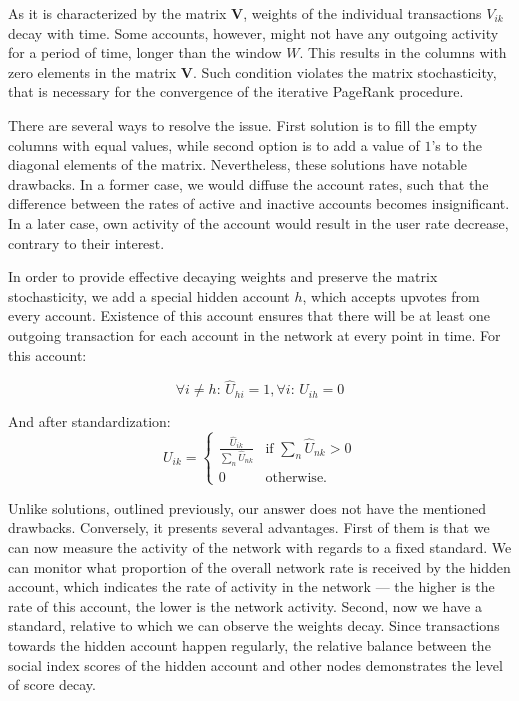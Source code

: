 \documentclass[a4paper,12pt]{article}
\begin{document}
	As it is characterized by the matrix $\boldsymbol{V}$, weights of the individual transactions $V_{ik}$ decay with time. Some accounts, however, might not have any outgoing activity for a period of time, longer than the window $W$. This results in the columns with zero elements in the matrix $\boldsymbol{V}$. Such condition violates the matrix stochasticity, that is necessary for the convergence of the iterative PageRank procedure. 
	
	There are several ways to resolve the issue. First solution is to fill the empty columns with equal values, while second option is to add a value of $1$'s to the diagonal elements of the matrix. Nevertheless, these solutions have notable drawbacks. In a former case, we would diffuse the account rates, such that the difference between the rates of active and inactive accounts becomes insignificant. In a later case, own activity of the account would result in the user rate decrease, contrary to their interest.
	
	In order to provide effective decaying weights and preserve the matrix stochasticity, we add a special hidden account $h$, which accepts upvotes from every account. Existence of this account ensures that there will be at least one outgoing transaction for each account in the network at every point in time. For this account:
	
	$$
	\forall i \ne h \text{: } \hat{U}_{hi} = 1,
	\forall i  \text{: } \hat{U}_{ih} = 0
	$$
	
	And after standardization:
	$$
U_{ik} = \begin{cases}
 \frac{\hat{U}_{ik}} {\sum_n{\hat{U}_{nk}}} & \text{if $\sum_n{\hat{U}_{nk}}>0$} \\
 0 & \text{otherwise.}
\end{cases}
$$

	Unlike solutions, outlined previously, our answer does not have the mentioned drawbacks. Conversely, it presents several advantages. First of them is that we can now measure the activity of the network with regards to a fixed standard. We can monitor what proportion of the overall network rate is received by the hidden account, which indicates the rate of activity in the network — the higher is the rate of this account, the lower is the network activity. Second, now we have a standard, relative to which we can observe the weights decay. Since transactions towards the hidden account happen regularly, the relative balance between the social index scores of the hidden account and other nodes demonstrates the level of score decay.
	
\end{document}
